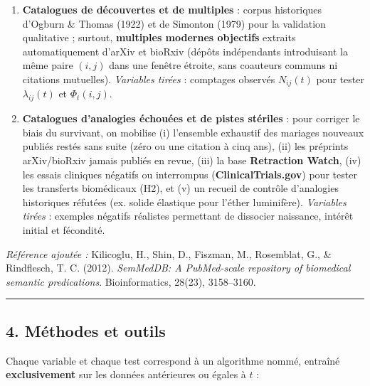 \documentclass[a4paper,11pt]{article}
\begin{document}
\begin{enumerate}
  mathématiques appliquées et biologie quantitative, par arbres
  d'opérateurs anonymisés (invariants au renommage des variables
  physiques).
\item
  \textbf{Catalogues de découvertes et de multiples} : corpus
  historiques d'Ogburn \& Thomas (1922) et de Simonton (1979) pour la
  validation qualitative ; surtout, \textbf{multiples modernes
  objectifs} extraits automatiquement d'arXiv et bioRxiv (dépôts
  indépendants introduisant la même paire \((i,j)\) dans une fenêtre
  étroite, sans coauteurs communs ni citations mutuelles).
  \emph{Variables tirées} : comptages observés \(N_{ij}(t)\) pour tester
  \(\lambda_{ij}(t)\) et \(\Phi_t(i,j)\).
\item
  \textbf{Catalogues d'analogies échouées et de pistes stériles} : pour
  corriger le biais du survivant, on mobilise (i) l'ensemble exhaustif
  des mariages nouveaux publiés restés sans suite (zéro ou une citation
  à cinq ans), (ii) les préprints arXiv/bioRxiv jamais publiés en revue,
  (iii) la base \textbf{Retraction Watch}, (iv) les essais cliniques
  négatifs ou interrompus (\textbf{ClinicalTrials.gov}) pour tester les
  transferts biomédicaux (H2), et (v) un recueil de contrôle d'analogies
  historiques réfutées (ex. solide élastique pour l'éther luminifère).
  \emph{Variables tirées} : exemples négatifs réalistes permettant de
  dissocier naissance, intérêt initial et fécondité.
\end{enumerate}

\emph{Référence ajoutée :} Kilicoglu, H., Shin, D., Fiszman, M.,
Rosemblat, G., \& Rindflesch, T. C. (2012). \emph{SemMedDB: A
PubMed-scale repository of biomedical semantic predications}.
Bioinformatics, 28(23), 3158--3160.

\begin{center}\rule{0.5\linewidth}{0.5pt}\end{center}

\subsection*{4. Méthodes et outils}

Chaque variable et chaque test correspond à un algorithme nommé,
entraîné \textbf{exclusivement} sur les données antérieures ou égales à
\(t\) :
\end{document}
